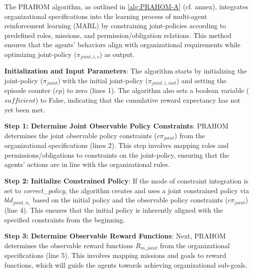 \documentclass[runningheads]{llncs}
\theoremstyle{freethm}
\theoremstyle{proofoutline}
\newcounter{relation}
\begin{document}


The PRAHOM algorithm, as outlined in \autoref{alg:PRAHOM-A} (cf. annex), integrates organizational specifications into the learning process of multi-agent reinforcement learning (MARL) by constraining joint-policies according to predefined roles, missions, and permission/obligation relations. This method ensures that the agents' behaviors align with organizational requirements while  optimizing joint-policy ($\pi_{joint,i,s}$) as output.

\textbf{Initialization and Input Parameters}: \quad
The algorithm starts by initializing the joint-policy ($\pi_{joint}$) with the initial joint-policy ($\pi_{joint,i,init}$) and setting the episode counter ($ep$) to zero (lines 1). The algorithm also sets a boolean variable ($sufficient$) to False, indicating that the cumulative reward expectancy has not yet been met.

\textbf{Step 1: Determine Joint Observable Policy Constraints}: \quad
PRAHOM determines the joint observable policy constraints ($c\pi_{joint}$) from the organizational specifications (lines 2). This step involves mapping roles and permissions/obligations to constraints on the joint-policy, ensuring that the agents' actions are in line with the organizational rules.

\textbf{Step 2: Initialize Constrained Policy}: \quad
If the mode of constraint integration is set to \textit{correct\_policy}, the algorithm creates and uses a joint constrained policy via $bld_{joint, \pi_c}$ based on the initial policy and the observable policy constraints ($c\pi_{joint}$) (line 4). This ensures that the initial policy is inherently aligned with the specified constraints from the beginning.

\textbf{Step 3: Determine Observable Reward Functions}: \quad
Next, PRAHOM determines the observable reward functions $R_{m,joint}$ from the organizational specifications (line 5). This involves mapping missions and goals to reward functions, which will guide the agents towards achieving organizational sub-goals.
\end{document}

